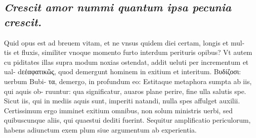 \documentclass{article}
\begin{document}
\begin{pages}
\subsection*{\textit{Crescit amor nummi quantum ipsa pecunia crescit. }}\pstart Quid opus est ad breuem vitam, et ne vnsus quidem diei certam, longis et mul- tis et fluxis, similiter vnoque momento furto interdum perituris opibus? Vt autem cu piditates illas supra modum noxias ostendat, addit ueluti per incrementum et ual- dεἐαφατικῶς, quod demergunt hominem in exitium et interitum. Βυδίζοσι: uerbum Bubi- τα, demergo, in profundum eo: Estitaque metaphora sumpta ab iis, qui aquis ob- ruuntur: qua significatur, auaros plane perire, fine ulla salutis spe. Sicut iis, qui in mediis aquis sunt, imperiti natandi, nulla spes affulget auxilii. Certissimum ergo imminet exitium omnibus, non solum ministris uerbi, sed quibuscunque aliis, qui quaestui dediti fuerint. Sequitur amplificatio periculorum, habens adiunctum exem plum siue argumentum ab experientia.  \pend
{}
{}

\end{pages}
\end{document}

